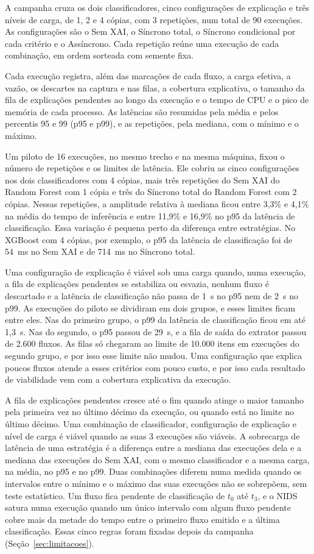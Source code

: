 \documentclass[
  article,
  12pt,
  oneside,
  a4paper,
  english,
  brazil
]{abntex2}
\begin{document}
A campanha cruza os dois classificadores, cinco configurações de explicação e três níveis de carga,
de 1, 2 e 4 cópias, com 3 repetições, num total de 90 execuções. As configurações são o Sem XAI, o
Síncrono total, o Síncrono condicional por cada critério e o Assíncrono. Cada repetição reúne uma
execução de cada combinação, em ordem sorteada com semente fixa.

Cada execução registra, além das marcações de cada fluxo, a carga efetiva, a vazão, os descartes na
captura e nas filas, a cobertura explicativa, o tamanho da fila de explicações pendentes ao longo da
execução e o tempo de CPU e o pico de memória de cada processo. As latências são resumidas pela
média e pelos percentis 95 e 99 (p95 e p99), e as repetições, pela mediana, com o mínimo e o máximo.

Um piloto de 16 execuções, no mesmo trecho e na mesma máquina, fixou o número de repetições e os
limites de latência. Ele cobriu as cinco configurações nos dois classificadores com 4 cópias, mais
três repetições do Sem XAI do Random Forest com 1 cópia e três do Síncrono total do Random Forest
com 2 cópias.
Nessas repetições, a amplitude relativa à mediana ficou entre 3,3\% e 4,1\% na média do tempo de
inferência e entre 11,9\% e 16,9\% no p95 da latência de classificação. Essa variação é pequena perto
da diferença entre estratégias. No XGBoost com 4 cópias, por exemplo, o p95 da latência de
classificação foi de 54~ms no Sem XAI e de 714~ms no Síncrono total.

Uma configuração de explicação é viável sob uma carga quando, numa execução, a fila de explicações
pendentes se estabiliza ou esvazia, nenhum fluxo é descartado e a latência de classificação não
passa de 1~s no p95 nem de 2~s no p99. As execuções do piloto se dividiram em dois grupos, e esses
limites ficam entre eles. Nas do primeiro grupo, o p99 da latência de classificação ficou em até
1,3~s. Nas do segundo, o p95 passou de 29~s, e a fila de saída do extrator passou de 2.600 fluxos. As
filas só chegaram ao limite de 10.000 itens em execuções do segundo grupo, e por isso esse limite não
mudou. Uma configuração que explica poucos fluxos atende a esses critérios com pouco custo, e por isso
cada resultado de viabilidade vem com a cobertura explicativa da execução.

A fila de explicações pendentes cresce até o fim quando atinge o maior tamanho pela primeira vez no
último décimo da execução, ou quando está no limite no último décimo. Uma combinação de
classificador, configuração de explicação e nível de carga é viável quando as suas 3 execuções são
viáveis. A sobrecarga de latência de uma estratégia é a diferença entre a mediana das execuções dela
e a mediana das execuções do Sem XAI, com o mesmo classificador e a mesma carga, na média, no p95 e
no p99. Duas combinações diferem numa medida quando os intervalos entre o mínimo e o máximo das suas
execuções não se sobrepõem, sem teste estatístico. Um fluxo fica pendente de classificação de $t_0$
até $t_3$, e o NIDS satura numa execução quando um único intervalo com algum fluxo pendente cobre mais
da metade do tempo entre o primeiro fluxo emitido e a última classificação. Essas cinco regras foram
fixadas depois da campanha (Seção~\ref{sec:limitacoes}).
\end{document}
